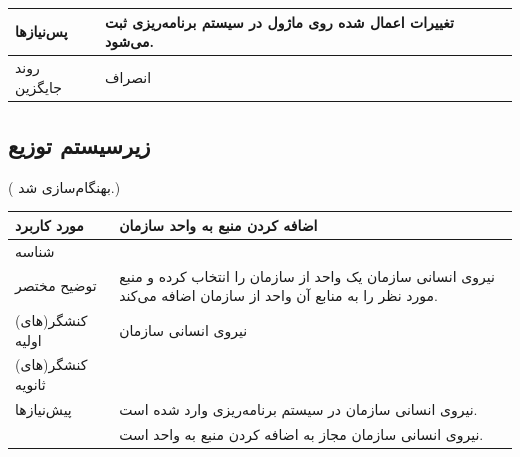 \begin{table}[H]
\begin{tabular}{|p{3cm}|p{10cm}|}
		\hline
		
		پس‌نیازها &
		تغییرات اعمال شده روی ماژول در سیستم برنامه‌ریزی ثبت می‌شود. \\
		
		\hline
		
		روند جایگزین
		& انصراف \\
		\hline
		
	\end{tabular}
\end{table}

\subsection{زیرسیستم توزیع}

({\color{red} بهنگام‌سازی شد.})
\begin{table}[H]
	\centering
	\begin{tabular}{|p{3cm}|p{10cm}|}
		\hline
		
		مورد کاربرد	& اضافه کردن منبع به واحد سازمان  \\
		\hline
		
		شناسه & 
		\stepcounter{usecase_ID}
		
		\arabic{usecase_ID} \\
		
		\hline
		
		توضیح مختصر & نیروی انسانی سازمان یک واحد از سازمان را انتخاب کرده و منبع مورد نظر را به منابع آن واحد از سازمان اضافه می‌کند. \\
		\hline
		
		کنشگر(های) اولیه& نیروی انسانی سازمان \\
		\hline
		
		کنشگر(های) ثانویه&  \\
		\hline
		
		پیش‌نیازها &
		نیروی انسانی سازمان در سیستم برنامه‌ریزی وارد شده است.\\
		& نیروی انسانی سازمان مجاز به اضافه کردن منبع به واحد است. \\
		\hline
		

\end{tabular}
\end{table}
